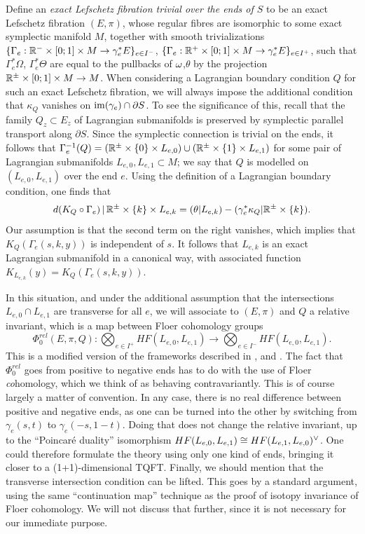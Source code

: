 \documentclass[10pt,letterpaper]{article}
\begin{document}
Define an {\em exact Lefschetz fibration trivial over the ends of $S$} to be an
exact Lefschetz fibration $(E,\pi)$, whose regular fibres are isomorphic to
some exact symplectic manifold $M$, together with smooth trivializations
$\{\Gamma_e: \mathbb{R}^- \times [0;1] \times M \rightarrow \gamma_e^*E\}_{e \in I^-}$,
$\{\Gamma_e: \mathbb{R}^+ \times [0;1] \times M \rightarrow \gamma_e^*E\}_{e \in I^+}$,
such that $\Gamma_e^*\Omega$, $\Gamma_e^*\Theta$ are equal to the pullbacks of
$\omega$,$\theta$ by the projection $\mathbb{R}^{\pm} \times [0;1] \times M \rightarrow M$.
When considering a Lagrangian boundary condition $Q$ for such an exact
Lefschetz fibration, we will always impose the additional condition that
$\kappa_Q$ vanishes on $\mathrm{im}(\gamma_e) \cap \partial S$. To see the significance
of this, recall that the family $Q_z \subset E_z$ of Lagrangian submanifolds is
preserved by symplectic parallel transport along $\partial S$. Since the
symplectic connection is trivial on the ends, it follows that
$
 \Gamma_e^{-1}(Q) =
 (\mathbb{R}^\pm \times \{0\} \times L_{e,0}) \cup
 (\mathbb{R}^\pm \times \{1\} \times L_{e,1})
$
for some pair of Lagrangian submanifolds $L_{e,0},L_{e,1} \subset M$; we say
that $Q$ is modelled on $(L_{e,0},L_{e,1})$ over the end $e$. Using the
definition of a Lagrangian boundary condition, one finds that
\[
 d(K_Q \circ \Gamma_e) \,|\, \mathbb{R}^{\pm} \times \{k\} \times L_{e,k} =
 (\theta | L_{e,k}) - (\gamma_e^*\kappa_Q | \mathbb{R}^{\pm} \times \{k\}).
\]
Our assumption is that the second term on the right vanishes, which implies
that $K_Q(\Gamma_e(s,k,y))$ is independent of $s$. It follows that $L_{e,k}$ is
an exact Lagrangian submanifold in a canonical way, with associated function
$K_{L_{e,k}}(y) = K_Q(\Gamma_e(s,k,y))$.

In this situation, and under the additional assumption that the intersections
$L_{e,0} \cap L_{e,1}$ are transverse for all $e$, we will associate to
$(E,\pi)$ and $Q$ a relative invariant, which is a map between Floer cohomology
groups
\[
 \Phi_0^{rel}(E,\pi,Q) : \bigotimes_{e \in I^+} HF(L_{e,0},L_{e,1})
 \longrightarrow \bigotimes_{e \in I^-} HF(L_{e,0},L_{e,1}).
\]
This is a modified version of the frameworks described in \cite{schwarz95},
\cite{piunikhin-salamon-schwarz94} and \cite{seidel97}. The fact that
$\Phi^{rel}_0$ goes from positive to negative ends has to do with the use of
Floer {\em co}homology, which we think of as behaving contravariantly. This is
of course largely a matter of convention. In any case, there is no real
difference between positive and negative ends, as one can be turned into the
other by switching from $\gamma_e(s,t)$ to $\gamma_e(-s,1-t)$. Doing that does
not change the relative invariant, up to the ``Poincar{\'e} duality''
isomorphism $HF(L_{e,0},L_{e,1}) \cong HF(L_{e,1},L_{e,0})^\vee$. One could
therefore formulate the theory using only one kind of ends, bringing it closer
to a (1+1)-dimensional TQFT. Finally, we should mention that the transverse
intersection condition can be lifted. This goes by a standard argument, using
the same ``continuation map'' technique as the proof of isotopy invariance of
Floer cohomology. We will not discuss that further, since it is not necessary
for our immediate purpose.
\end{document}
